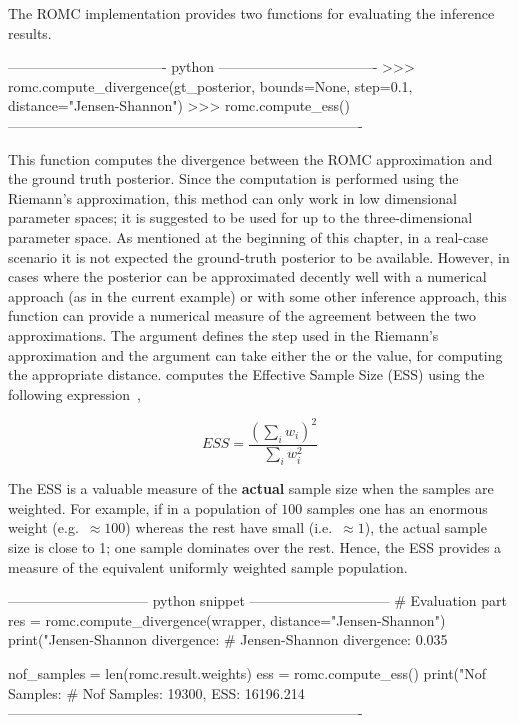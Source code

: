 The ROMC implementation provides two functions for evaluating the
inference results.

\begin{Code}
---------------------------------- python ----------------------------------  
>>> romc.compute_divergence(gt_posterior,
                            bounds=None,
                            step=0.1,
                            distance="Jensen-Shannon")
>>> romc.compute_ess()
----------------------------------------------------------------------------
\end{Code}

\noindent
This function computes the divergence between the ROMC approximation
and the ground truth posterior. Since the computation is performed
using the Riemann's approximation, this method can only work in low
dimensional parameter spaces; it is suggested to be used for up to the
three-dimensional parameter space. As mentioned at the beginning of
this chapter, in a real-case scenario it is not expected the
ground-truth posterior to be available. However, in cases where the
posterior can be approximated decently well with a numerical approach
(as in the current example) or with some other inference approach,
this function can provide a numerical measure of the agreement between
the two approximations. The argument  defines the step used
in the Riemann's approximation and the argument  can
take either the  or the 
value, for computing the appropriate distance. 
computes the Effective Sample Size (ESS) using the following
expression~\cite{Sudman1967},

\begin{equation} \label{eq:ESS}
  ESS = \frac{(\sum_i w_i)^2}{\sum_i w_i^2}
\end{equation}

The ESS is a valuable measure of the \textbf{actual} sample size when
the samples are weighted. For example, if in a population of $100$
samples one has an enormous weight (e.g.\ $\approx 100$) whereas the
rest have small (i.e.\ $\approx 1$), the actual sample size is close
to 1; one sample dominates over the rest. Hence, the ESS provides a
measure of the equivalent uniformly weighted sample population.

\begin{Code}
------------------------------ python snippet ------------------------------  
  # Evaluation part
  res = romc.compute_divergence(wrapper, distance="Jensen-Shannon")                                 
  print("Jensen-Shannon divergence: %
  # Jensen-Shannon divergence: 0.035

  nof_samples = len(romc.result.weights)
  ess = romc.compute_ess()
  print("Nof Samples: %
  # Nof Samples: 19300, ESS: 16196.214
----------------------------------------------------------------------------  
\end{Code}
